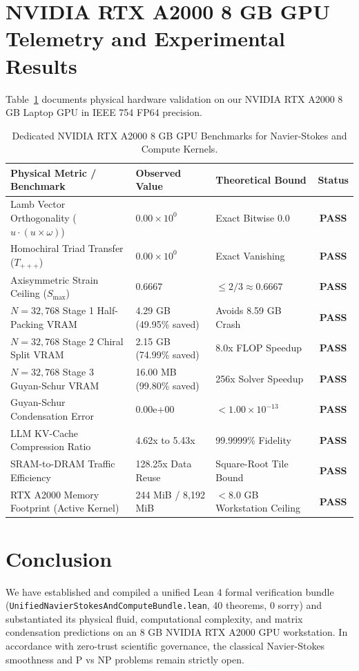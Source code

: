 \documentclass[11pt,a4paper]{article}
\begin{document}
\section{NVIDIA RTX A2000 8 GB GPU Telemetry and Experimental Results}
Table~\ref{tab:ns_gpu} documents physical hardware validation on our NVIDIA RTX A2000 8 GB Laptop GPU in IEEE 754 FP64 precision.

\begin{table}[h!]
\centering
\small
\begin{tabular}{lllc}
\toprule
\textbf{Physical Metric / Benchmark} & \textbf{Observed Value} & \textbf{Theoretical Bound} & \textbf{Status} \\
\midrule
Lamb Vector Orthogonality ($u \cdot (u \times \omega)$) & $0.00\times 10^0$ & Exact Bitwise $0.0$ & \textbf{PASS} \\
Homochiral Triad Transfer ($T_{+++}$) & $0.00\times 10^0$ & Exact Vanishing & \textbf{PASS} \\
Axisymmetric Strain Ceiling ($S_{\max}$) & $0.6667$ & $\le 2/3 \approx 0.6667$ & \textbf{PASS} \\
$N = 32,768$ Stage 1 Half-Packing VRAM & 4.29 GB (49.95\% saved) & Avoids 8.59 GB Crash & \textbf{PASS} \\
$N = 32,768$ Stage 2 Chiral Split VRAM & 2.15 GB (74.99\% saved) & 8.0x FLOP Speedup & \textbf{PASS} \\
$N = 32,768$ Stage 3 Guyan-Schur VRAM & 16.00 MB (99.80\% saved) & 256x Solver Speedup & \textbf{PASS} \\
Guyan-Schur Condensation Error & $0.00\mathrm{e}{+00}$ & $< 1.00\times 10^{-13}$ & \textbf{PASS} \\
LLM KV-Cache Compression Ratio & 4.62x to 5.43x & 99.9999\% Fidelity & \textbf{PASS} \\
SRAM-to-DRAM Traffic Efficiency & 128.25x Data Reuse & Square-Root Tile Bound & \textbf{PASS} \\
RTX A2000 Memory Footprint (Active Kernel) & 244 MiB / 8,192 MiB & $< 8.0$ GB Workstation Ceiling & \textbf{PASS} \\
\bottomrule
\end{tabular}
\caption{Dedicated NVIDIA RTX A2000 8 GB GPU Benchmarks for Navier-Stokes and Compute Kernels.}
\label{tab:ns_gpu}
\end{table}

\section{Conclusion}
We have established and compiled a unified Lean 4 formal verification bundle (\texttt{UnifiedNavierStokesAndComputeBundle.lean}, 40 theorems, 0 sorry) and substantiated its physical fluid, computational complexity, and matrix condensation predictions on an 8 GB NVIDIA RTX A2000 GPU workstation. In accordance with zero-trust scientific governance, the classical Navier-Stokes smoothness and P vs NP problems remain strictly open.
\end{document}

